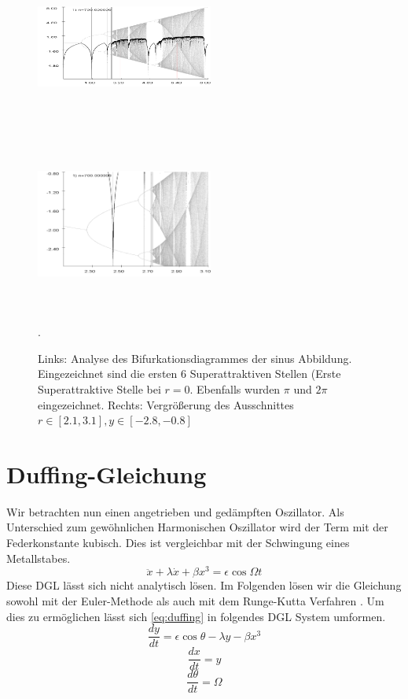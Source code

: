 \documentclass[12pt,a4paper]{article}
\begin{document}
\begin{figure}[!htbp]
\centering
\includegraphics[height=220px, width= 220px]{bifurkation-sin}
\includegraphics[height= 220px, width= 220px]{bifurkation-sin-zoom}
\caption{Links: Analyse des Bifurkationsdiagrammes der sinus Abbildung. Eingezeichnet sind die ersten 6 Superattraktiven Stellen (Erste Superattraktive Stelle bei $r=0$. Ebenfalls wurden $\pi$ und $2\pi$ eingezeichnet. Rechts: Vergrößerung des Ausschnittes $r \in [2.1,3.1], y\in[-2.8,-0.8]$}. 
\label{fig:bifurc-sin}
\end{figure}
\newpage
\section { Duffing-Gleichung}
Wir betrachten nun einen angetrieben und gedämpften Oszillator. Als Unterschied zum gewöhnlichen Harmonischen Oszillator wird der Term mit der Federkonstante kubisch. Dies ist vergleichbar mit der Schwingung eines Metallstabes.
\begin{equation}
\ddot{x}+\lambda\dot{x}+\beta x^3=\epsilon\cos{\Omega t}
\label{eq:duffing}
\end{equation} 
Diese DGL lässt sich nicht analytisch lösen.
Im Folgenden lösen wir die Gleichung sowohl mit der Euler-Methode \parencite{wiki:euler} als auch mit dem Runge-Kutta Verfahren \parencite{wiki:runge}. Um dies zu ermöglichen lässt sich \eqref{eq:duffing} in folgendes DGL System umformen.
\begin{equation}\frac{dy}{dt}=\epsilon\cos{\theta}-\lambda y - \beta x^3\end{equation}
\begin{equation}\frac{dx}{dt}=y\end{equation}
\begin{equation}\frac{d\theta}{dt}=\Omega\end{equation}
\newline
\end{document}
